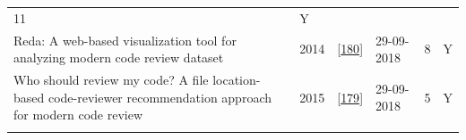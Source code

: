 \documentclass[]{book}
\begin{document}
\begin{longtable}[]{@{}llllll@{}}
\begin{minipage}[t]{0.07\columnwidth}
11\strut
\end{minipage} & \begin{minipage}[t]{0.08\columnwidth}\raggedright\strut
Y\strut
\end{minipage}\tabularnewline
\begin{minipage}[t]{0.47\columnwidth}\raggedright\strut
Reda: A web-based visualization tool for analyzing modern code review
dataset\strut
\end{minipage} & \begin{minipage}[t]{0.03\columnwidth}\raggedright\strut
2014\strut
\end{minipage} & \begin{minipage}[t]{0.13\columnwidth}\raggedright\strut
{[}\protect\hyperlink{ref-thongtanunam2014reda}{180}{]}\strut
\end{minipage} & \begin{minipage}[t]{0.06\columnwidth}\raggedright\strut
29-09-2018\strut
\end{minipage} & \begin{minipage}[t]{0.07\columnwidth}\raggedright\strut
8\strut
\end{minipage} & \begin{minipage}[t]{0.08\columnwidth}\raggedright\strut
Y\strut
\end{minipage}\tabularnewline
\begin{minipage}[t]{0.47\columnwidth}\raggedright\strut
Who should review my code? A file location-based code-reviewer
recommendation approach for modern code review\strut
\end{minipage} & \begin{minipage}[t]{0.03\columnwidth}\raggedright\strut
2015\strut
\end{minipage} & \begin{minipage}[t]{0.13\columnwidth}\raggedright\strut
{[}\protect\hyperlink{ref-thongtanunam2015should}{179}{]}\strut
\end{minipage} & \begin{minipage}[t]{0.06\columnwidth}\raggedright\strut
29-09-2018\strut
\end{minipage} & \begin{minipage}[t]{0.07\columnwidth}\raggedright\strut
5\strut
\end{minipage} & \begin{minipage}[t]{0.08\columnwidth}\raggedright\strut
Y\strut
\end{minipage}\tabularnewline
\begin{minipage}[t]{0.47\columnwidth}\raggedright\strut

\end{minipage}
\end{longtable}
\end{document}
